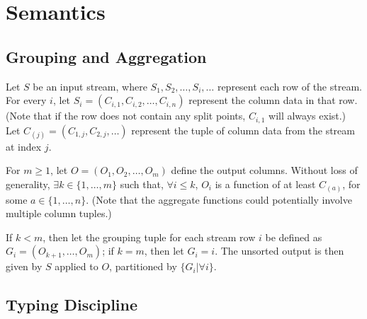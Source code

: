 % 
% 
% 
% 
% 

\section{Semantics}

\subsection{Grouping and Aggregation}


Let $S$ be an input stream, where $S_1, S_2, \ldots, S_i, \ldots$
represent each row of the stream. For every $i$, let $S_i=(C_{i,1},
C_{i,2}, \ldots, C_{i,n})$ represent the column data in that row. (Note
that if the row does not contain any split points, $C_{i,1}$ will always
exist.) Let $C_{(j)}=(C_{1,j}, C_{2,j}, \ldots)$ represent the tuple of
column data from the stream at index $j$.

For $m\geq 1$, let $O=(O_1, O_2, \ldots, O_m)$ define the output
columns. Without loss of generality, $\exists k\in\{1, \ldots, m\}$
such that, $\forall i\leq k$, $O_i$ is a function of at least $C_{(a)}$,
for some $a\in\{1, \ldots, n\}$. (Note that the aggregate functions
could potentially involve multiple column tuples.)

If $k<m$, then let the grouping tuple for each stream row $i$ be defined
as $G_i=(O_{k+1}, \ldots, O_m)$; if $k=m$, then let $G_i=i$. The
unsorted output is then given by $S$ applied to $O$, partitioned by
$\{G_i | \forall i\}$.

\subsection{Typing Discipline}

